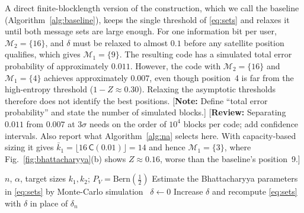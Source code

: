 \documentclass[conference]{IEEEtran}
\newcommand{\Csf}{\mathsf{C}}
\newcommand{\Ms}{\mathcal{M}}
\newcommand{\Bern}{\mathrm{Bern}}
\newcommand{\authornote}[1]{{\color{red}\footnotesize[\textbf{Note:} #1]}}
\newcommand{\reviewnote}[1]{{\color{red}\footnotesize[\textbf{Review:} #1]}}
\begin{document}
A direct finite-blocklength version of the construction, which we call the baseline (Algorithm~\ref{alg:baseline}), keeps the single threshold of \eqref{eq:sets} and relaxes it until both message sets are large enough. For one information bit per user, $\Ms_2=\{16\}$, and $\delta$ must be relaxed to almost $0.1$ before any satellite position qualifies, which gives $\Ms_1=\{9\}$. The resulting code has a simulated total error probability of approximately $0.011$. However, the code with $\Ms_2=\{16\}$ and $\Ms_1=\{4\}$ achieves approximately $0.007$, even though position~4 is far from the high-entropy threshold ($1-Z\approx0.30$). Relaxing the asymptotic thresholds therefore does not identify the best positions. \authornote{Define ``total error probability'' and state the number of simulated blocks.} \reviewnote{Separating $0.011$ from $0.007$ at $3\sigma$ needs on the order of $10^4$ blocks per code; add confidence intervals. Also report what Algorithm~\ref{alg:na} selects here. With capacity-based sizing it gives $\bar k_1=\lfloor16\,\Csf(0.01)\rfloor=14$ and hence $\Ms_1=\{3\}$, where Fig.~\ref{fig:bhattacharyya}(b) shows $Z\approx0.16$, worse than the baseline's position~9.}

\begin{algorithm}[t]
\caption{Baseline selection}
\label{alg:baseline}
\begin{algorithmic}[1]
\REQUIRE $n$, $\alpha$, target sizes $k_1,k_2$; $P_V=\Bern(\frac12)$
\STATE Estimate the Bhattacharyya parameters in \eqref{eq:sets} by Monte-Carlo simulation~\cite[Sec.~IV-E]{6975233}
\STATE $\delta\gets0$
\WHILE{$|\Ms_1|<k_1$ \OR $|\Ms_2|<k_2$}
\STATE Increase $\delta$ and recompute \eqref{eq:sets} with $\delta$ in place of $\delta_n$
\ENDWHILE
\end{algorithmic}
\end{algorithm}
\end{document}
